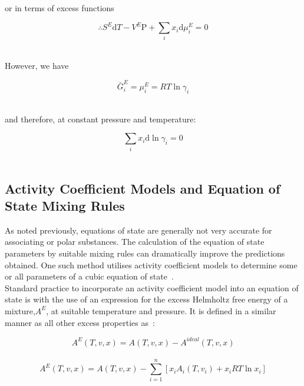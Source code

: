 or in terms of excess functions\

\begin{equation}
\therefore S^{E}\mathrm{d}T - V^{E} \mathrm{P} + \sum_{i} x_{i} \mathrm{d}\mu_{i}^{E} = 0 \label{GibbsEnergyGibbsDuhem}
\end{equation}\

However, we have\

\begin{equation}
\bar{G}^{E}_{i} = \mu_{i}^{E} = RT \ln \gamma_{i}
\end{equation}\

and therefore, at constant pressure and temperature:\

\begin{equation}
\sum_{i} x_{i} \mathrm{d} \ln \gamma_{i} = 0
\end{equation}\


\subsection{Activity Coefficient Models and Equation of State Mixing Rules}

As noted previously, equations of state are generally not very accurate for associating or polar substances. The calculation of the equation of state parameters by suitable mixing rules can dramatically improve the predictions obtained. One such method utilises activity coefficient models to determine some or all parameters of a cubic equation of state~\cite{ThermophysicalProperties}.\\

Standard practice to incorporate an activity coefficient model into an equation of state is with the use of an expression for the excess Helmholtz free energy of a mixture,$A^{E}$, at suitable temperature and pressure. It is defined in a similar manner as all other excess properties as~\cite{ThermophysicalProperties}:\

\begin{equation}
A^{E}\left(T, v, x\right) = A\left(T, v, x\right) - A^{ideal}\left(T, v, x\right)
\end{equation}\
\begin{equation}
A^{E}\left(T, v, x\right) = A \left(T, v, x\right) - \sum_{i=1}^{n} \left[x_{i}A_{i}\left(T, v_{i}\right) + x_{i}RT\ln x_{i}\right] \label{ExcessHelmholtz}
\end{equation}\

